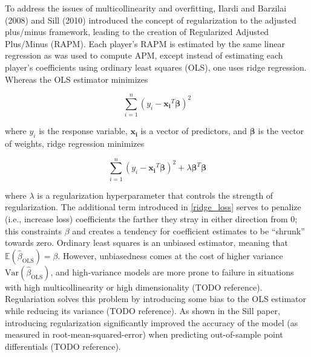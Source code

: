 To address the issues of multicollinearity and overfitting, Ilardi and Barzilai
(2008) and Sill (2010) introduced the concept of regularization to the adjusted
plus/minus framework, leading to the creation of Regularized Adjusted Plus/Minus
(RAPM). Each player’s RAPM is estimated by the same linear regression as was used to
compute APM, except instead of estimating each player’s coefficients using ordinary
least squares (OLS), one uses ridge regression. Whereas the OLS estimator minimizes

\begin{equation} \label{ols_loss}
    \sum_{i=1}^n \left( y_i - \bm{x_i}^T\bm{\beta} \right)^2
\end{equation}

where $y_i$ is the response variable, $\bm{x_i}$ is a vector of predictors, and
$\bm{\beta}$ is the vector of weights, ridge regression minimizes

\begin{equation} \label{ridge_loss}
    \sum_{i=1}^n \left( y_i - \bm{x_i}^T\bm{\beta} \right)^2 + \lambda
    \bm{\beta}^T\bm{\beta}
\end{equation}

where $\lambda$ is a regularization hyperparameter that controls the strength of
regularization. The additional term introduced in \eqref{ridge_loss} serves to
penalize (i.e., increase loss) coefficients the farther they stray in either
direction from 0; this constraints $\beta$ and creates a tendency for coefficient
estimates to be “shrunk” towards zero. Ordinary least squares is an unbiased
estimator, meaning that $\mathbb{E} \left(\hat\beta_{\text{OLS}}\right) = \beta$.
However, unbiasedness comes at the cost of higher variance
$\text{Var}\left(\hat\beta_{\text{OLS}}\right)$, and high-variance models are more
prone to failure in situations with high multicollinearity or high dimensionality
(TODO reference). Regulariation solves this problem by introducing some bias to the
OLS estimator while reducing its variance (TODO reference). As shown in the Sill
paper, introducing regularization significantly improved the accuracy of the model
(as measured in root-mean-squared-error) when predicting out-of-sample point
differentials (TODO reference).

